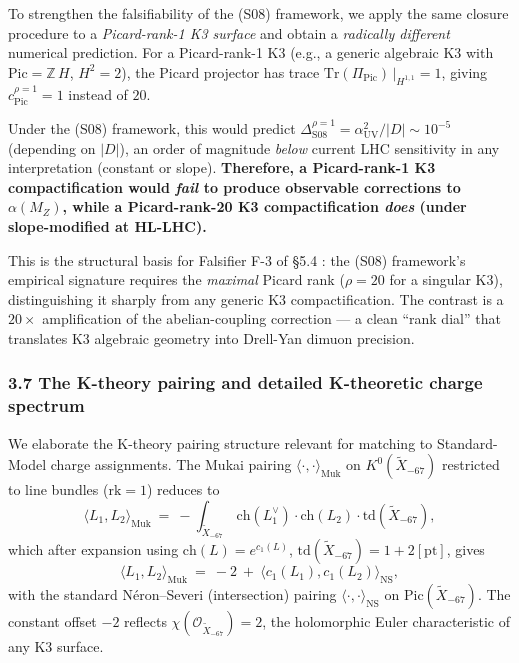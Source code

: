 \documentclass[
  11pt,
  a4paper,
]{article}
\begin{document}
To strengthen the falsifiability of the (S08) framework, we apply the same closure procedure to a \emph{Picard-rank-1 K3 surface} and obtain a \emph{radically different} numerical prediction. For a Picard-rank-1 K3 (e.g., a generic algebraic K3 with \(\mathrm{Pic} = \mathbb Z\,H\), \(H^2 = 2\)), the Picard projector has trace \(\mathrm{Tr}(\Pi_{\mathrm{Pic}})\,|_{H^{1,1}} = 1\), giving \(c_{\mathrm{Pic}}^{\rho=1} = 1\) instead of \(20\).

Under the (S08) framework, this would predict \(\Delta_{\mathrm{S08}}^{\rho=1} = \alpha_{\mathrm{UV}}^2 / |D| \sim 10^{-5}\) (depending on \(|D|\)), an order of magnitude \emph{below} current LHC sensitivity in any interpretation (constant or slope). \textbf{Therefore, a Picard-rank-1 K3 compactification would \emph{fail} to produce observable corrections to \(\alpha(M_Z)\), while a Picard-rank-20 K3 compactification \emph{does} (under slope-modified at HL-LHC).}

This is the structural basis for Falsifier F-3 of §5.4 : the (S08) framework's empirical signature requires the \emph{maximal} Picard rank (\(\rho = 20\) for a singular K3), distinguishing it sharply from any generic K3 compactification. The contrast is a \(20\times\) amplification of the abelian-coupling correction --- a clean ``rank dial'' that translates K3 algebraic geometry into Drell-Yan dimuon precision.

\hypertarget{the-k-theory-pairing-and-detailed-k-theoretic-charge-spectrum}{%
\subsubsection{3.7 The K-theory pairing and detailed K-theoretic charge spectrum}\label{the-k-theory-pairing-and-detailed-k-theoretic-charge-spectrum}}

We elaborate the K-theory pairing structure relevant for matching to Standard-Model charge assignments. The Mukai pairing \(\langle\cdot,\cdot\rangle_{\mathrm{Muk}}\) on \(K^0(\tilde X_{-67})\) restricted to line bundles (\(\mathrm{rk} = 1\)) reduces to
\[
\langle L_1, L_2\rangle_{\mathrm{Muk}}\ =\ -\int_{\tilde X_{-67}}\,\mathrm{ch}(L_1^\vee)\cdot \mathrm{ch}(L_2)\cdot \mathrm{td}(\tilde X_{-67}),
\]
which after expansion using \(\mathrm{ch}(L) = e^{c_1(L)}\), \(\mathrm{td}(\tilde X_{-67}) = 1 + 2[\mathrm{pt}]\), gives
\[
\langle L_1, L_2\rangle_{\mathrm{Muk}}\ =\ -2\ +\ \langle c_1(L_1), c_1(L_2)\rangle_{\mathrm{NS}},
\]
with the standard Néron--Severi (intersection) pairing \(\langle\cdot,\cdot\rangle_{\mathrm{NS}}\) on \(\mathrm{Pic}(\tilde X_{-67})\). The constant offset \(-2\) reflects \(\chi(\mathcal O_{\tilde X_{-67}}) = 2\), the holomorphic Euler characteristic of any K3 surface.
\end{document}
